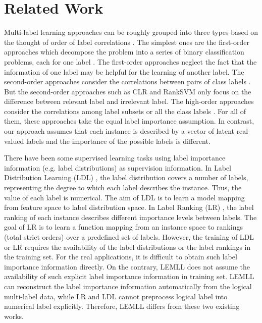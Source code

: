 \documentclass[conference]{IEEEtran}
\begin{document}
\section{Related Work}
Multi-label learning approaches can be roughly grouped into three types based on the thought of order of label correlations \cite{zhang2014review}. The simplest ones are the first-order approaches which decompose the problem into a series of binary classification problems, each for one label \cite{boutell2004learning,zhang2007ml}. The first-order approaches neglect the fact that the information of one label may be helpful for the learning of another label. The second-order approaches consider the correlations between pairs of class labels \cite{elisseeff2002kernel,furnkranz2008multilabel}. But the second-order approaches such as CLR \cite{furnkranz2008multilabel} and RankSVM \cite{elisseeff2002kernel} only focus on the difference between relevant label and irrelevant label. The high-order approaches consider the correlations among label subsets or all the class labels \cite{read2011classifier,tsoumakas2011random}. For all of them, these approaches take the equal label importance assumption. In contrast, our approach assumes that each instance is described by a vector of latent real-valued labels and the importance of the possible labels is different.

There have been some supervised learning tasks using label importance information (e.g. label distributions) as supervision information. In Label Distribution Learning (LDL) \cite{geng2016label}, the label distribution covers a number of labels, representing the degree to which each label describes the instance. Thus, the value of each label is numerical. The aim of LDL is to learn a model mapping from feature space to label distribution space. In Label Ranking (LR) \cite{furnkranz2003pairwise,dekel2004log,hullermeier2008label}, the label ranking of each instance describes different importance levels between labels. The goal of LR is to learn a function mapping from an instance space to rankings (total strict orders) over a predefined set of labels. However, the training of LDL or LR requires the availability of the label distributions or the label rankings in the training set. For the real applications, it is difficult to obtain such label importance information directly. On the contrary, LEMLL does not assume the availability of such explicit label importance information in training set. LEMLL can reconstruct the label importance information automatically from the logical multi-label data, while LR and LDL cannot preprocess logical label into numerical label explicitly. Therefore, LEMLL differs from these two existing works.
\end{document}
